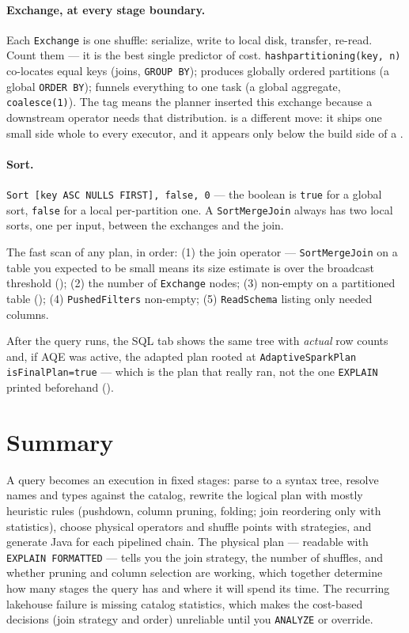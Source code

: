 \paragraph{Exchange, at every stage boundary.} Each \texttt{Exchange} is one
shuffle: serialize, write to local disk, transfer, re-read. Count them --- it is
the best single predictor of cost. \texttt{hashpartitioning(key, n)} co-locates
equal keys (joins, \texttt{GROUP BY});  produces
globally ordered partitions (a global \texttt{ORDER BY}); 
funnels everything to one task (a global aggregate, \texttt{coalesce(1)}). The
 tag means the planner inserted this exchange because
a downstream operator needs that distribution.  is a
different move: it ships one small side whole to every executor, and it appears
only below the build side of a .

\paragraph{Sort.} \texttt{Sort [key ASC NULLS FIRST], false, 0} --- the boolean
is \texttt{true} for a global sort, \texttt{false} for a local per-partition one.
A \texttt{SortMergeJoin} always has two local sorts, one per input, between the
exchanges and the join.

\begin{tip}
The fast scan of any plan, in order: (1) the join operator ---
\texttt{SortMergeJoin} on a table you expected to be small means its size
estimate is over the broadcast threshold (); (2) the number of \texttt{Exchange} nodes; (3)
 non-empty on a partitioned table ();
(4) \texttt{PushedFilters} non-empty; (5) \texttt{ReadSchema} listing only needed
columns.
\end{tip}

After the query runs, the SQL tab shows the same tree with \emph{actual} row
counts and, if AQE was active, the adapted plan rooted at
\texttt{AdaptiveSparkPlan isFinalPlan=true} --- which is the plan that really ran,
not the one \texttt{EXPLAIN} printed beforehand ().

\section{Summary}
\label{sec:catalyst-summary}

A query becomes an execution in fixed stages: parse to a syntax tree, resolve
names and types against the catalog, rewrite the logical plan with mostly
heuristic rules (pushdown, column pruning, folding; join reordering only with
statistics), choose physical operators and shuffle points with strategies, and
generate Java for each pipelined chain. The physical plan --- readable with
\texttt{EXPLAIN FORMATTED} --- tells you the join strategy, the number of
shuffles, and whether pruning and column selection are working, which together
determine how many stages the query has and where it will spend its time. The
recurring lakehouse failure is missing catalog statistics, which makes the
cost-based decisions (join strategy and order) unreliable until you
\texttt{ANALYZE} or override.

